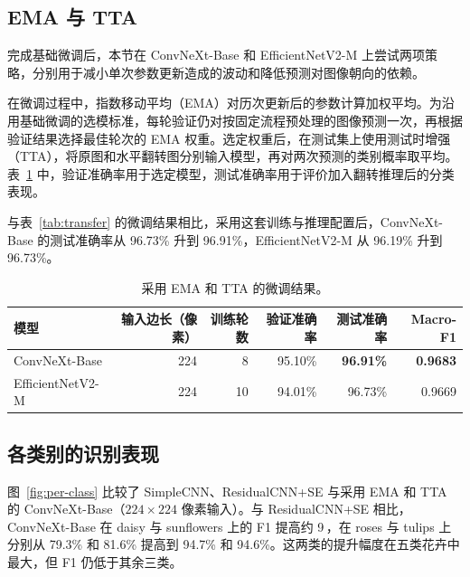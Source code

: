 \documentclass[11pt,a4paper,UTF8,fontset=windows]{ctexart}
\newcommand{\best}[1]{\textbf{#1}}
\newcommand{\pp}{\,\text{pp}}
\begin{document}
\subsection{EMA 与 TTA}
\label{sec:ema-tta}

完成基础微调后，本节在 ConvNeXt-Base 和 EfficientNetV2-M 上尝试两项策略，分别用于减小单次参数更新造成的波动和降低预测对图像朝向的依赖。

在微调过程中，指数移动平均（EMA）对历次更新后的参数计算加权平均。为沿用基础微调的选模标准，每轮验证仍对按固定流程预处理的图像预测一次，再根据验证结果选择最佳轮次的 EMA 权重。选定权重后，在测试集上使用测试时增强（TTA），将原图和水平翻转图分别输入模型，再对两次预测的类别概率取平均。表~\ref{tab:transfer-enhanced} 中，验证准确率用于选定模型，测试准确率用于评价加入翻转推理后的分类表现。

与表~\ref{tab:transfer} 的微调结果相比，采用这套训练与推理配置后，ConvNeXt-Base 的测试准确率从 96.73\% 升到 96.91\%，EfficientNetV2-M 从 96.19\% 升到 96.73\%。

\begin{table}[htbp]
\centering
\small
\caption{采用 EMA 和 TTA 的微调结果。}
\label{tab:transfer-enhanced}
\begin{tabular}{lrrrrr}
\toprule
模型 & 输入边长（像素） & 训练轮数 & 验证准确率 & 测试准确率 & Macro-F1 \\
\midrule
ConvNeXt-Base    & 224 & 8  & 95.10\% & \best{96.91\%} & \best{0.9683} \\
EfficientNetV2-M & 224 & 10 & 94.01\% & 96.73\% & 0.9669 \\
\bottomrule
\end{tabular}
\end{table}

\subsection{各类别的识别表现}

图~\ref{fig:per-class} 比较了 SimpleCNN、ResidualCNN+SE 与采用 EMA 和 TTA 的 ConvNeXt-Base（$224\times224$ 像素输入）。与 ResidualCNN+SE 相比，ConvNeXt-Base 在 daisy 与 sunflowers 上的 F1 提高约 9\pp，在 roses 与 tulips 上分别从 79.3\% 和 81.6\% 提高到 94.7\% 和 94.6\%。这两类的提升幅度在五类花卉中最大，但 F1 仍低于其余三类。
\end{document}
